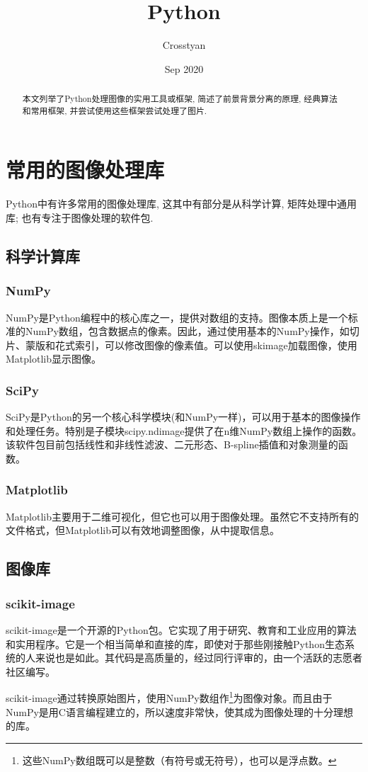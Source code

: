 \documentclass[scheme=chinese,a4paper]{article}
\title{Python}
\author{Crosstyan}
\date{Sep 2020}
\begin{document}
% 
\begin{abstract}
本文列举了Python处理图像的实用工具或框架, 简述了前景背景分离的原理, 经典算法和常用框架, 并尝试使用这些框架尝试处理了图片. 
\end{abstract}
\section{常用的图像处理库}
Python中有许多常用的图像处理库\cite{web:tools}, 这其中有部分是从科学计算, 矩阵处理中通用库; 也有专注于图像处理的软件包. 
\subsection{科学计算库}
\subsubsection{NumPy}
NumPy是Python编程中的核心库之一，提供对数组的支持。图像本质上是一个标准的NumPy数组，包含数据点的像素。因此，通过使用基本的NumPy操作，如切片、蒙版和花式索引，可以修改图像的像素值。可以使用skimage加载图像，使用Matplotlib显示图像。
\subsubsection{SciPy}
SciPy是Python的另一个核心科学模块(和NumPy一样)，可以用于基本的图像操作和处理任务。特别是子模块scipy.ndimage提供了在n维NumPy数组上操作的函数。该软件包目前包括线性和非线性滤波、二元形态、B-spline插值和对象测量的函数。
\subsubsection{Matplotlib}
Matplotlib主要用于二维可视化，但它也可以用于图像处理。虽然它不支持所有的文件格式，但Matplotlib可以有效地调整图像，从中提取信息。
\subsection{图像库}
\subsubsection{scikit-image}
scikit-image是一个开源的Python包。它实现了用于研究、教育和工业应用的算法和实用程序。它是一个相当简单和直接的库，即使对于那些刚接触Python生态系统的人来说也是如此。其代码是高质量的，经过同行评审的，由一个活跃的志愿者社区编写。

scikit-image通过转换原始图片，使用NumPy数组作\footnote{这些NumPy数组既可以是整数（有符号或无符号），也可以是浮点数。}为图像对象。而且由于NumPy是用C语言编程建立的，所以速度非常快，使其成为图像处理的十分理想的库。
\end{document}
